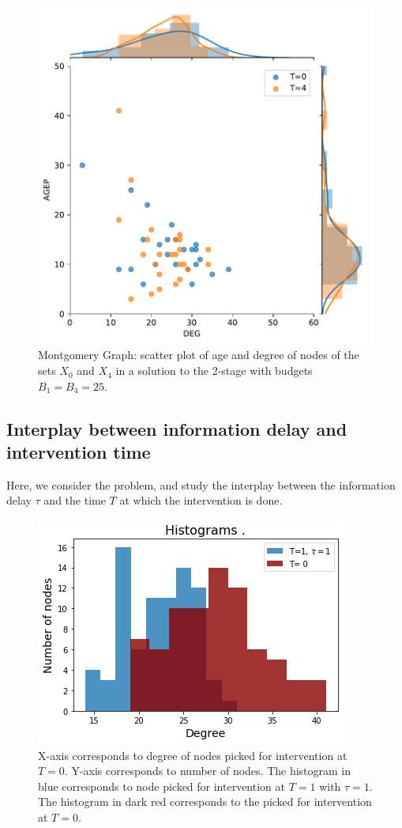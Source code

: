 \begin{figure}[!h]
    \centering
    \includegraphics[scale = 0.45]{figures/t0_t4_compare_age_deg.pdf}
    \caption{Montgomery Graph: scatter plot of age and degree of nodes of the sets $X_0$ and $X_4$ in a solution to the 2-stage \prob{} with budgets $B_1 = B_4 = 25$.}
    \label{fig:montagedeg}
\end{figure}

\subsection{Interplay between information delay and intervention time}

Here, we consider the \probdelay{} problem, and study the interplay between the information delay $\tau$ and the time $T$ at which the intervention is done. 

\begin{figure}[!h]
    \centering
    \includegraphics[scale = 0.6]{figures/histogram.png}
    \caption{X-axis corresponds to degree of nodes picked for intervention at $T=0$. Y-axis corresponds to number of nodes. The histogram in blue corresponds to node picked for intervention at $T = 1$ with $\tau = 1$. The histogram in dark red corresponds to the picked for intervention at $T = 0$.}
    \label{fig:hist}
\end{figure}


